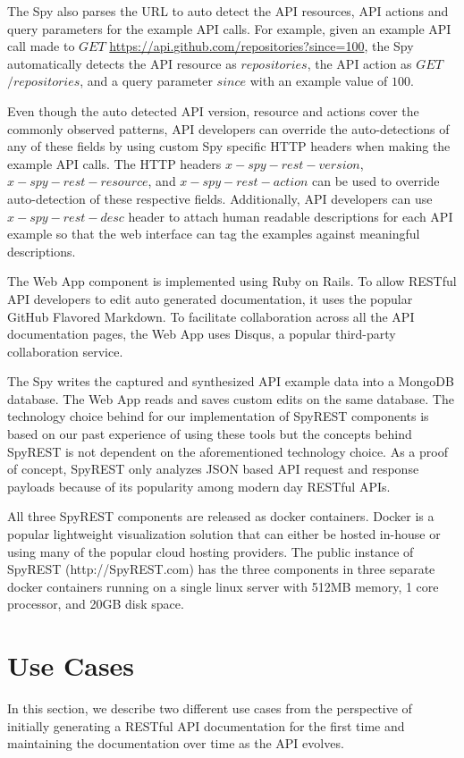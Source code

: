 \documentclass[conference]{IEEEtran}
\begin{document}
The Spy also parses the URL to auto detect the API resources, API actions and query parameters for the example API calls. For example, given an example API call made to $GET$ \url{https://api.github.com/repositories?since=100}, the Spy automatically detects the API resource as $repositories$, the API action as $GET$ $/repositories$, and a query parameter $since$ with an example value of $100$.

Even though the auto detected API version, resource and actions cover the commonly observed patterns, API developers can override the auto-detections of any of these fields by using custom Spy specific HTTP headers when making the example API calls. The HTTP headers $x-spy-rest-version$, $x-spy-rest-resource$, and $x-spy-rest-action$ can be used to override auto-detection of these respective fields. Additionally, API developers can use $x-spy-rest-desc$ header to attach human readable descriptions for each API example so that the web interface can tag the examples against meaningful descriptions.

The Web App component is implemented using Ruby on Rails. To allow RESTful API developers to edit auto generated documentation, it uses the popular GitHub Flavored Markdown. To facilitate collaboration across all the API documentation pages, the Web App uses Disqus, a popular third-party collaboration service.

The Spy writes the captured and synthesized API example data into a MongoDB database. The Web App reads and saves custom edits on the same database. The technology choice behind for our implementation of SpyREST components is based on our past experience of using these tools but the concepts behind SpyREST is not dependent on the aforementioned technology choice. As a proof of concept, SpyREST only analyzes JSON based API request and response payloads because of its popularity among modern day RESTful APIs.

All three SpyREST components are released as docker containers. Docker is a popular lightweight visualization solution that can either be hosted in-house or using many of the popular cloud hosting providers. The public instance of SpyREST (http://SpyREST.com) has the three components in three separate docker containers running on a single linux server with 512MB memory, 1 core processor, and 20GB disk space.

\section{Use Cases}
In this section, we describe two different use cases from the perspective of initially generating a RESTful API documentation for the first time and maintaining the documentation over time as the API evolves.
\end{document}
